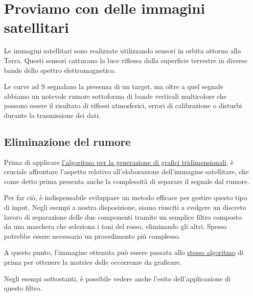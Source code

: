 \section{Proviamo con delle immagini satellitari}
Le immagini satellitari sono realizzate utilizzando sensori in orbita attorno alla Terra. Questi sensori catturano la luce riflessa dalla superficie terrestre in diverse bande dello spettro elettromagnetico.\par
Le curve ad S segnalano la presenza di un target, ma oltre a quel segnale abbiamo un notevole rumore sottoforma di bande verticali multicolore che possono essere il risultato di riflessi atmosferici, errori di calibrazione o disturbi durante la trasmissione dei dati.

\subsection{Eliminazione del rumore}
Prima di applicare \hyperref[lst:ostinelli]{l'algoritmo per la generazione di grafici tridimensionali}, è cruciale affrontare l'aspetto relativo all'elaborazione dell'immagine satellitare, che come detto prima presenta anche la complessità di separare il segnale dal rumore.\par
Per far ciò, è indispensabile sviluppare un metodo efficace per gestire questo tipo di input. Negli esempi a nostra disposizione, siamo riusciti a svolgere un discreto lavoro di separazione delle due componenti tramite un semplice filtro composto da una maschera che seleziona i toni del rosso, eliminando gli altri. Spesso potrebbe essere necessario un procedimento più complesso.

\vspace{10pt}

\vspace{10pt}

A questo punto, l'immagine ottenuta può essere passata allo \hyperref[lst:ostinelli]{stesso algoritmo} di prima per ottenere la matrice delle occorrenze da graficare.\par
Negli esempi sottostanti, è possibile vedere anche l'esito dell'applicazione di questo filtro.

\newpage
